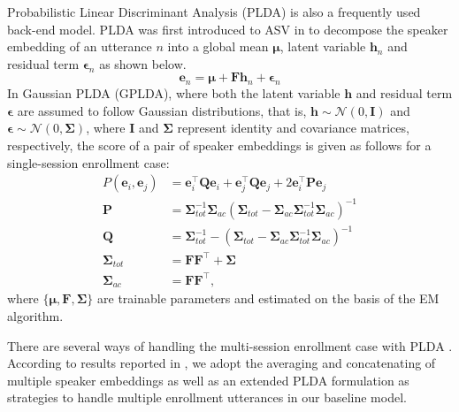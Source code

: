 \documentclass{article}
\begin{document}
Probabilistic Linear Discriminant Analysis (PLDA) is also a frequently used back-end model. PLDA was first introduced to ASV in \cite{first_plda} to decompose the speaker embedding of an utterance $n$ into a global mean $\boldsymbol{\mu}$, latent variable $\boldsymbol{h}_n$ and residual term $\boldsymbol{\epsilon}_{n}$ as shown below.
\begin{equation}
\label{plda}
\boldsymbol{e}_{n}=\boldsymbol{\mu}+\boldsymbol{F}\boldsymbol{h}_n+\boldsymbol{\epsilon}_{n}
\end{equation}
In Gaussian PLDA (GPLDA), where both the latent variable $\boldsymbol{h}$ and residual term $\boldsymbol{\epsilon}$ are assumed to follow Gaussian distributions, that is, $\boldsymbol{h} \sim \mathcal{N}(0, \mathbf{I})$ and $\boldsymbol{\epsilon} \sim \mathcal{N}(0, \mathbf{\Sigma})$, where $\mathbf{I}$ and $\boldsymbol{\Sigma}$ represent identity and covariance matrices, respectively, the score of a pair of speaker embeddings is given as follows for a single-session enrollment case:
\begin{align}
    \label{plda_s}
    P(\boldsymbol{e}_{i},\boldsymbol{e}_{j}) & = \boldsymbol{e}_{i}^\top \boldsymbol{Q}\boldsymbol{e}_{i}+\boldsymbol{e}_{j}^\top \boldsymbol{Q}\boldsymbol{e}_{j}+2\boldsymbol{e}_{i}^\top \boldsymbol{P}\boldsymbol{e}_{j} \\
    \boldsymbol{P} & = \boldsymbol{\Sigma}^{-1}_{tot}\boldsymbol{\Sigma}_{ac}(\boldsymbol{\Sigma}_{tot}-\boldsymbol{\Sigma}_{ac}\boldsymbol{\Sigma}^{-1}_{tot}\boldsymbol{\Sigma}_{ac})^{-1}  \\ 
    \boldsymbol{Q} & =\boldsymbol{\Sigma}^{-1}_{tot}-(\boldsymbol{\Sigma}_{tot}-\boldsymbol{\Sigma}_{ac}\boldsymbol{\Sigma}^{-1}_{tot}\boldsymbol{\Sigma}_{ac})^{-1} \\
    \boldsymbol{\Sigma}_{tot} & =\boldsymbol{F}\boldsymbol{F}^\top+\boldsymbol{\Sigma} \\ 
    \boldsymbol{\Sigma}_{ac} & =\boldsymbol{F}\boldsymbol{F}^\top ,
\end{align}
where $\{\boldsymbol{\mu},\boldsymbol{F},\boldsymbol{\Sigma}\}$ are trainable parameters and estimated on the basis of the EM algorithm. 





There are several ways of handling the multi-session enrollment case with PLDA \cite{kong_plda, ville_plda}. According to results reported in \cite{kong_plda, ville_plda}, we adopt the averaging and concatenating of multiple speaker embeddings as well as an extended PLDA formulation \cite{ville_plda} as strategies to handle multiple enrollment utterances in our baseline model.
\vspace{-1mm}
\end{document}

